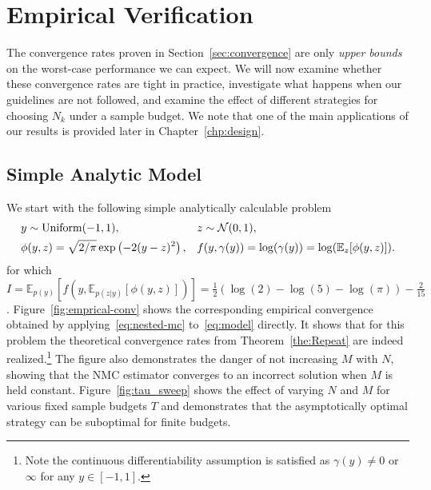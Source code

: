 
\section{Empirical Verification}
\label{sec:empirical}

The convergence rates proven in Section~\ref{sec:convergence} are only
\emph{upper bounds} on the worst-case performance we can expect. We will now
examine whether these convergence rates are tight in practice, investigate what happens
when our guidelines are not followed, and examine the effect of different strategies for
choosing $N_k$ under a sample budget.  We note that one of the main applications of
our results is provided later in Chapter~\ref{chp:design}.

\subsection{Simple Analytic Model}
\label{sec:simple}

We start with the following simple analytically calculable problem
\begin{equation}
\begin{aligned}
\label{eq:model}
& y \sim \mathrm{Uniform}(-1,1), &&
z \sim \mathcal{N}(0,1), \\
& \phi(y,z) = \sqrt{2/\pi}\exp\left(-2(y-z)^2\right), &&
f(y,\gamma(y)) = \log (\gamma (y)) = \log(\mathbb{E}_z[\phi(y,z)]).
\end{aligned}
\end{equation}
for which $I = \mathbb{E}_{p(y)}\left[f\left(y,\mathbb{E}_{p(z|y)}
\left[\phi(y,z)\right]\right)\right]=\frac{1}{2}\left(\log(2)-\log(5)-\log(\pi)\right)-\frac{2}{15}$.
Figure~\ref{fig:emprical-conv} shows the corresponding empirical convergence obtained by
applying~\eqref{eq:nested-mc} to~\eqref{eq:model} directly. It shows that for this
problem the theoretical convergence rates from Theorem~\ref{the:Repeat} are indeed
realized.\footnote{Note the continuous differentiability assumption is satisfied as $\gamma(y)\neq0$
or $\infty$ for any $y\in[-1,1]$.}
The figure also demonstrates the danger of not increasing
$M$ with $N$, showing that the NMC estimator converges to an incorrect solution when $M$
is held constant.  Figure~\ref{fig:tau_sweep} shows the effect of varying $N$ and $M$ for various
fixed sample budgets $T$ and demonstrates that the asymptotically optimal strategy can be suboptimal
for finite budgets.

